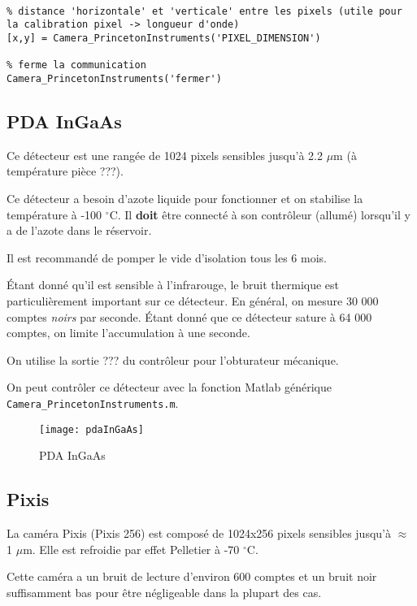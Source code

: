 \documentclass[11pt,francais]{book} %
\begin{document}
\begin{lstlisting}[frame=single,caption={Exemple d'utilisation des caméras Princeton Instruments avec Matlab},label={lst:excameraprincetoninstruments},breaklines=true,]
% De maniere similaire que 'GET_PARAMETER', on peut ecrire un parametre avec 'SET_PARAMETER'.

% distance 'horizontale' et 'verticale' entre les pixels (utile pour la calibration pixel -> longueur d'onde)
[x,y] = Camera_PrincetonInstruments('PIXEL_DIMENSION')

% ferme la communication
Camera_PrincetonInstruments('fermer')

\end{lstlisting}

\subsection{PDA InGaAs}

Ce détecteur est une rangée de 1024 pixels sensibles jusqu'à 2.2 $\mu$m (à température pièce ???).

Ce détecteur a besoin d'azote liquide pour fonctionner et on stabilise la température à -100 $^{\circ}$C.
Il {\bf doit} être connecté à son contrôleur (allumé) lorsqu'il y a de l'azote dans le réservoir.

Il est recommandé de pomper le vide d'isolation tous les 6 mois.

Étant donné qu'il est sensible à l'infrarouge, le bruit thermique est particulièrement important sur ce détecteur.
En général, on mesure 30 000 comptes {\it noirs} par seconde.
Étant donné que ce détecteur sature à 64 000 comptes, on limite l'accumulation à une seconde.

On utilise la sortie ??? du contrôleur pour l'obturateur mécanique.

On peut contrôler ce détecteur avec la fonction Matlab générique \verb!Camera_PrincetonInstruments.m!.

\begin{figure}[h]
  \centering\texttt{[image: pdaInGaAs]}
  \caption{PDA InGaAs}
  \label{fig:pdaingaas}
\end{figure}

\subsection{Pixis}

La caméra Pixis (Pixis 256) est composé de 1024x256 pixels sensibles jusqu'à $\approx$ 1 $\mu$m.
Elle est refroidie par effet Pelletier à -70 $^{\circ}$C.

Cette caméra a un bruit de lecture d'environ 600 comptes et un bruit noir suffisamment bas pour être négligeable dans la plupart des cas.
\end{document}
